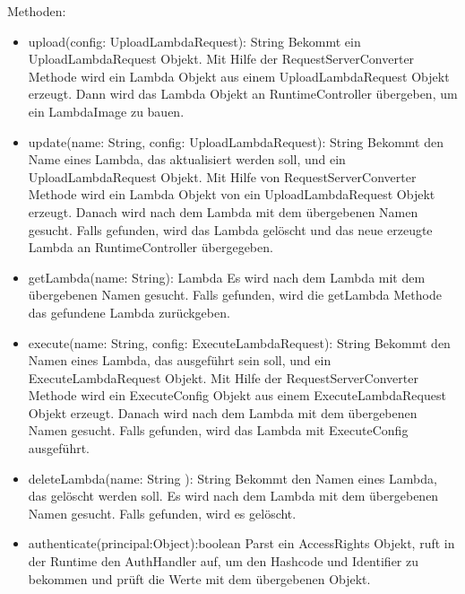 \documentclass[a4paper,20pt,oneside]{book}
\begin{document}
	Methoden:
	\begin{itemize}
	\item  upload(config: UploadLambdaRequest): String\linebreak
	Bekommt ein UploadLambdaRequest Objekt. Mit Hilfe der RequestServerConverter Methode wird ein Lambda Objekt aus einem UploadLambdaRequest Objekt erzeugt. Dann wird das Lambda Objekt an RuntimeController übergeben, um ein LambdaImage zu bauen.
	
	\item update(name: String, config: UploadLambdaRequest): String \linebreak
	Bekommt den Name eines Lambda, das aktualisiert werden soll, und ein UploadLambdaRequest Objekt. Mit Hilfe von RequestServerConverter Methode wird ein Lambda Objekt von ein UploadLambdaRequest Objekt erzeugt. Danach wird nach dem Lambda mit dem übergebenen Namen gesucht. Falls gefunden, wird das  Lambda gelöscht und das neue erzeugte Lambda an RuntimeController übergegeben.
	
	\item getLambda(name: String): Lambda\linebreak
	Es wird nach dem Lambda mit dem übergebenen Namen gesucht. Falls    gefunden, wird die getLambda Methode das gefundene Lambda zurückgeben.
	\item execute(name: String, config: ExecuteLambdaRequest): String\linebreak
	Bekommt den Namen eines Lambda, das ausgeführt sein soll, und ein ExecuteLambdaRequest Objekt. Mit Hilfe der RequestServerConverter Methode wird ein ExecuteConfig Objekt aus einem ExecuteLambdaRequest Objekt erzeugt. Danach wird nach dem Lambda mit dem übergebenen Namen gesucht. Falls gefunden, wird das Lambda  mit ExecuteConfig ausgeführt.
	\item deleteLambda(name: String ): String\linebreak
	Bekommt den Namen eines Lambda, das gelöscht werden soll. Es wird  nach dem Lambda mit dem übergebenen Namen gesucht. Falls gefunden, wird es gelöscht.
	
	\item authenticate(principal:Object):boolean\linebreak
	Parst ein AccessRights Objekt, ruft in der Runtime den AuthHandler auf, um den Hashcode und Identifier zu bekommen und prüft die Werte mit dem übergebenen Objekt.
	\end{itemize}

	
	
\end{document}
